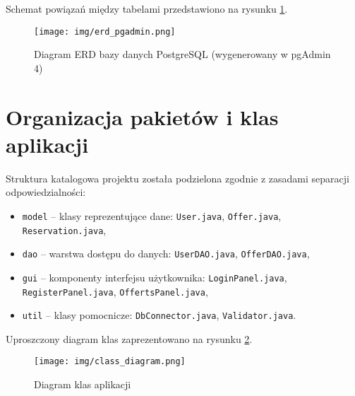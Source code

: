 Schemat powiązań między tabelami przedstawiono na rysunku \ref{fig:erd_pgadmin}.

\begin{figure}[H]
    \centering
    \texttt{[image: img/erd\_pgadmin.png]}
    \caption{Diagram ERD bazy danych PostgreSQL (wygenerowany w pgAdmin 4)}
    \label{fig:erd_pgadmin}
\end{figure}

\section{Organizacja pakietów i klas aplikacji}

Struktura katalogowa projektu została podzielona zgodnie z zasadami separacji odpowiedzialności:

\begin{itemize}
    \item \texttt{model} – klasy reprezentujące dane: \texttt{User.java}, \texttt{Offer.java}, \texttt{Reservation.java},
    \item \texttt{dao} – warstwa dostępu do danych: \texttt{UserDAO.java}, \texttt{OfferDAO.java},
    \item \texttt{gui} – komponenty interfejsu użytkownika: \texttt{LoginPanel.java}, \texttt{RegisterPanel.java}, \texttt{OffertsPanel.java},
    \item \texttt{util} – klasy pomocnicze: \texttt{DbConnector.java}, \texttt{Validator.java}.
\end{itemize}

Uproszczony diagram klas zaprezentowano na rysunku \ref{fig:class_diagram}.

\begin{figure}[H]
    \centering
    \texttt{[image: img/class\_diagram.png]}
    \caption{Diagram klas aplikacji}
    \label{fig:class_diagram}
\end{figure}
